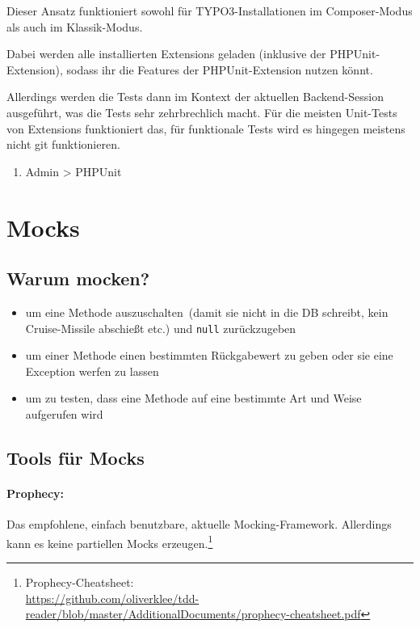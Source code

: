 \documentclass[a4paper,10pt,headsepline]{scrartcl}
\begin{document}
Dieser Ansatz funktioniert sowohl für TYPO3-Installationen im Composer-Modus als auch im Klassik-Modus.

Dabei werden alle installierten Extensions geladen (inklusive der PHPUnit-Extension), sodass ihr die Features der PHPUnit-Extension nutzen könnt.

Allerdings werden die Tests dann im Kontext der aktuellen Backend-Session ausgeführt, was die Tests sehr zehrbrechlich macht. Für die meisten Unit-Tests von Extensions funktioniert das, für funktionale Tests wird es hingegen meistens nicht git funktionieren.

\begin{enumerate}
  \item Admin > PHPUnit
\end{enumerate}



\pagebreak
\section{Mocks}

\subsection{Warum mocken?}
\begin{itemize}
  \item um eine Methode \glqq auszuschalten\grqq\ (damit sie nicht in die DB schreibt, kein Cruise-Missile abschießt etc.) und \texttt{null} zurückzugeben
  \item um einer Methode einen bestimmten Rückgabewert zu geben oder sie eine Exception werfen zu lassen
  \item um zu testen, dass eine Methode auf eine bestimmte Art und Weise aufgerufen wird
\end{itemize}

\subsection{Tools für Mocks}

\paragraph{Prophecy:} Das empfohlene, einfach benutzbare, aktuelle Mocking-Framework. Allerdings kann es keine partiellen Mocks erzeugen.\footnote{Prophecy-Cheatsheet:\\ \url{https://github.com/oliverklee/tdd-reader/blob/master/AdditionalDocuments/prophecy-cheatsheet.pdf}}
\end{document}
